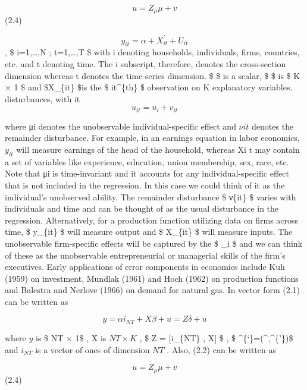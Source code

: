 \documentclass[
]{book}
\begin{document}
\[ u=Z_\mu \mu +v  \] (2.4)

\[  y_{it} = \alpha + X_{it}^{'} + U_{it}   \] , \$ i=1,\ldots,N ; t=1,\ldots,T \$ with i denoting households, individuals, firms, countries, etc. and t denoting time. The i subscript, therefore, denotes the cross-section dimension whereas t denotes the time-series dimension. \$ \alpha \$ is a scalar, \$ \beta \$ is \$ K × 1 \$ and \$X\_\{it\} \$is the \$ it\^{}\{th\} \$ observation on K explanatory variables. disturbances, with it \[ u_{it}=u_i  + v_{it}     \]

where μi denotes the unobservable individual-specific effect and \(ν{it}\) denotes the remainder disturbance. For example, in an earnings equation in labor economics, \(y_{it}\) will measure earnings of the head of the household, whereas Xi t may contain a set of variables like experience, education, union membership, sex, race, etc. Note that μi is time-invariant and it accounts for any individual-specific effect that is not included in the regression. In this case we could think of it as the individual's unobserved ability. The remainder disturbance \$ ν\{it\} \$ varies with individuals and time and can be thought of as the usual disturbance in the regression. Alternatively, for a production function utilizing data on firms across time, \$ y\_\{it\} \$ will measure output and \$ X\_\{it\} \$ will measure inputs. The unobservable firm-specific effects will be captured by the \$ \mu\_i \$ and we can think of these as the unobservable entrepreneurial or managerial skills of the firm's executives. Early applications of error components in economics include Kuh (1959) on investment, Mundlak (1961) and Hoch (1962) on production functions and Balestra and Nerlove (1966) on demand for natural gas. In vector form (2.1) can be written as

\[ y= \alpha i_{NT}  + X\beta +u = Z\delta + u \]

where \(y\) is \$ NT × 1\$ , X is \(NT × K\) , \$ Z = {[}i\_\{NT\} , X{]} \$ , \$ \delta\^{}\{`\}=(\^{},\beta\^{}\{'\})\$ and \(i_{NT}\) is a vector of ones of dimension \(NT\) . Also, (2.2) can be written as

\[ u=Z_\mu \mu  + v\] (2.4)
\end{document}
